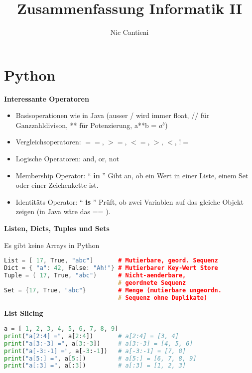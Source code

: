 \documentclass[german]{latex4ei/latex4ei_sheet}
\title{Zusammenfassung Informatik II}
\author{Nic Cantieni}					%
\begin{document}
\maketitle

\section{Python}

\begin{sectionbox}

\textbf{Interessante Operatoren}
\begin{itemize}
    \item Basisoperationen wie in Java (ausser / wird immer float, // für Ganzzahldivison, ** für Potenzierung, a**b = $a^{b}$)
    \item Vergleichsoperatoren: $==$, $>=$, $<=$, $>$, $<$, !$=$
    \item Logische Operatoren: and, or, not
    \item Membership Operator: “ \textbf{in} ” Gibt an, ob ein Wert in einer Liste, einem Set oder einer Zeichenkette ist.
    \item Identitäts Operator: “ \textbf{is} ” Prüft, ob zwei Variablen auf das gleiche Objekt zeigen (in Java wäre das == ).
\end{itemize}\medskip

\textbf{Listen, Dicts, Tuples und Sets}\par
Es gibt keine Arrays in Python\par\vspace{-4px}
\begin{lstlisting}[language=C++]
List = [ 17, True, "abc"]       # Mutierbare, geord. Sequenz
Dict = { "a": 42, False: "Ah!"} # Mutierbarer Key-Wert Store
Tuple = ( 17, True, "abc")      # Nicht-aenderbare,
                                # geordnete Sequenz
Set = {17, True, "abc"}         # Menge (mutierbare ungeordn.
                                # Sequenz ohne Duplikate)
\end{lstlisting}

\textbf{List Slicing}\vspace{-4px}
\begin{lstlisting}[language=Python]
a = [ 1, 2, 3, 4, 5, 6, 7, 8, 9]
print("a[2:4] =", a[2:4])       # a[2:4] = [3, 4]
print("a[3:-3] =", a[3:-3])     # a[3:-3] = [4, 5, 6]
print("a[-3:-1] =", a[-3:-1])   # a[-3:-1] = [7, 8]
print("a[5:] =", a[5:])         # a[5:] = [6, 7, 8, 9]
print("a[:3] =", a[:3])         # a[:3] = [1, 2, 3]
\end{lstlisting}


\end{sectionbox}
\end{document}

